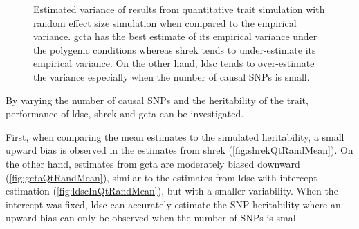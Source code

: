 \documentclass[12pt]{scrbook}
\begin{document}
\begin{figure}
{		
		\label{fig:ldscInQtRandVarCom}
	}
	\caption[Estimation of Variance in Quantitative Trait Simulation]
	{Estimated variance of results from quantitative trait simulation with random effect size simulation when compared to the empirical variance.
		\gls{gcta} has the best estimate of its empirical variance under the polygenic conditions whereas \gls{shrek} tends to under-estimate its empirical variance.
		On the other hand, \gls{ldsc} tends to over-estimate the variance especially when the number of causal \glspl{SNP} is small.
	} 
	\label{fig:QtRandVarCom}
\end{figure}
By varying the number of causal \glspl{SNP} and the heritability of the trait, performance of \gls{ldsc}, \gls{shrek} and \gls{gcta} can be investigated.

First, when comparing the mean estimates to the simulated heritability, a small upward bias is observed in the estimates from \gls{shrek} (\cref{fig:shrekQtRandMean}).
On the other hand, estimates from \gls{gcta} are moderately biased downward (\cref{fig:gctaQtRandMean}), similar to the estimates from \gls{ldsc} with intercept estimation (\cref{fig:ldscInQtRandMean}), but with a smaller variability.
When the intercept was fixed, \gls{ldsc} can accurately estimate the \gls{SNP} heritability where an upward bias can only be observed when the number of \glspl{SNP} is small.
\end{document}
